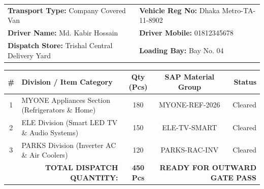 \documentclass[11pt, a4paper]{article}
\begin{document}
\vspace{-4pt}

\begin{tcolorbox}[colback=white, colframe=bordergrey, title=\textbf{\color{darknavy}{2. TRANSPORT \& FLEET ALLOCATION}}, fonttitle=\bfseries, arc=3pt, left=8pt, right=8pt, top=6pt, bottom=6pt]
  \renewcommand{\arraystretch}{1.2}
  \begin{tabularx}{\textwidth}{@{} X X @{}}
    \textbf{Transport Type:} Company Covered Van & \textbf{Vehicle Reg No:} Dhaka Metro-TA-11-8902 \\
    \textbf{Driver Name:} Md. Kabir Hossain & \textbf{Driver Mobile:} 01812345678 \\
    \textbf{Dispatch Store:} Trishal Central Delivery Yard & \textbf{Loading Bay:} Bay No. 04 \\
  \end{tabularx}
\end{tcolorbox}

\vspace{-4pt}

\begin{tcolorbox}[colback=white, colframe=bordergrey, title=\textbf{\color{darknavy}{3. DISPATCH MANIFEST (450 UNITS)}}, fonttitle=\bfseries, arc=3pt, left=8pt, right=8pt, top=6pt, bottom=6pt]
  \renewcommand{\arraystretch}{1.2}
  \begin{tabularx}{\textwidth}{@{} c X c c r @{}}
    \hline
    \textbf{\#} & \textbf{Division / Item Category} & \textbf{Qty (Pcs)} & \textbf{SAP Material Group} & \textbf{Status} \\
    \hline
    1 & MYONE Appliances Section (Refrigerators \& Home) & 180 & MYONE-REF-2026 & Cleared \\
    2 & ELE Division (Smart LED TV \& Audio Systems) & 150 & ELE-TV-SMART & Cleared \\
    3 & PARKS Division (Inverter AC \& Air Coolers) & 120 & PARKS-RAC-INV & Cleared \\
    \hline
    \multicolumn{2}{r}{\textbf{TOTAL DISPATCH QUANTITY:}} & \textbf{450 Pcs} & \multicolumn{2}{r}{\textbf{READY FOR OUTWARD GATE PASS}} \\
    \hline
  \end{tabularx}
\end{tcolorbox}
\end{document}
